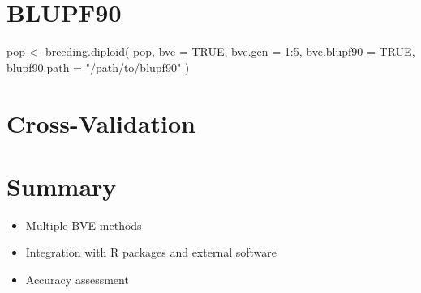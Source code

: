 \documentclass[
  letterpaper,
]{book}
\newenvironment{Shaded}{\begin{snugshade}}{\end{snugshade}}
\newcommand{\AttributeTok}[1]{\textcolor[rgb]{0.40,0.45,0.13}{#1}}
\newcommand{\CommentTok}[1]{\textcolor[rgb]{0.37,0.37,0.37}{#1}}
\newcommand{\ConstantTok}[1]{\textcolor[rgb]{0.56,0.35,0.01}{#1}}
\newcommand{\DecValTok}[1]{\textcolor[rgb]{0.68,0.00,0.00}{#1}}
\newcommand{\FunctionTok}[1]{\textcolor[rgb]{0.28,0.35,0.67}{#1}}
\newcommand{\NormalTok}[1]{\textcolor[rgb]{0.00,0.23,0.31}{#1}}
\newcommand{\OtherTok}[1]{\textcolor[rgb]{0.00,0.23,0.31}{#1}}
\newcommand{\SpecialCharTok}[1]{\textcolor[rgb]{0.37,0.37,0.37}{#1}}
\newcommand{\StringTok}[1]{\textcolor[rgb]{0.13,0.47,0.30}{#1}}
\providecommand{\tightlist}{%
  \setlength{\itemsep}{0pt}\setlength{\parskip}{0pt}}
\begin{document}
\section{BLUPF90}\label{blupf90}

\begin{Shaded}
\begin{Highlighting}[]
\NormalTok{pop }\OtherTok{\textless{}{-}} \FunctionTok{breeding.diploid}\NormalTok{(}
\NormalTok{  pop,}
  \AttributeTok{bve =} \ConstantTok{TRUE}\NormalTok{,}
  \AttributeTok{bve.gen =} \DecValTok{1}\SpecialCharTok{:}\DecValTok{5}\NormalTok{,}
  \AttributeTok{bve.blupf90 =} \ConstantTok{TRUE}\NormalTok{,}
  \AttributeTok{blupf90.path =} \StringTok{"/path/to/blupf90"}
\NormalTok{)}
\end{Highlighting}
\end{Shaded}

\section{Cross-Validation}\label{cross-validation}

\begin{Shaded}
\end{Shaded}

\section{Summary}\label{summary-12}

\begin{itemize}
\tightlist
\item
  Multiple BVE methods
\item
  Integration with R packages and external software
\item
  Accuracy assessment
\end{itemize}
\end{document}
